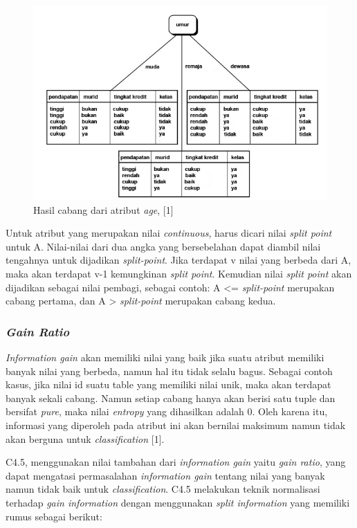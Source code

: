 \begin{figure}
\includegraphics[scale=1]{Gambar/hasilcabangid3.jpg}
\caption[Hasil pohon faktor pada atribut \textsl{age} dari table 2.1]{Hasil cabang dari atribut \textsl{age}, [1]} 
\end{figure}

Untuk atribut yang merupakan nilai \textsl{continuous}, harus dicari nilai \textsl{split point} untuk A. Nilai-nilai dari dua angka yang bersebelahan dapat diambil nilai tengahnya untuk dijadikan \textsl{split-point}. Jika terdapat v nilai yang berbeda dari A, maka akan terdapat v-1 kemungkinan \textsl{split point}. Kemudian nilai \textsl{split point} akan dijadikan sebagai nilai pembagi, sebagai contoh: A <= \textsl{split-point} merupakan cabang pertama, dan A > \textsl{split-point} merupakan cabang kedua.

\subsubsection{\textsl{Gain Ratio}}
\textsl{Information gain} akan memiliki nilai yang baik jika suatu atribut memiliki banyak nilai yang berbeda, namun hal itu tidak selalu bagus. Sebagai contoh kasus, jika nilai id suatu table yang memiliki nilai unik, maka akan terdapat banyak sekali cabang. Namun setiap cabang hanya akan berisi satu tuple dan bersifat \textsl{pure}, maka nilai \textsl{entropy} yang dihasilkan adalah 0. Oleh karena itu, informasi yang diperoleh pada atribut ini akan bernilai maksimum namun tidak akan berguna untuk \textsl{classification} [1].

C4.5, menggunakan nilai tambahan dari \textsl{information gain} yaitu \textsl{gain ratio}, yang dapat mengatasi permasalahan \textsl{information gain} tentang nilai yang banyak namun tidak baik untuk \textsl{classification}. C4.5 melakukan teknik normalisasi terhadap \textsl{gain information} dengan menggunakan \textsl{split information} yang memiliki rumus sebagai berikut:

